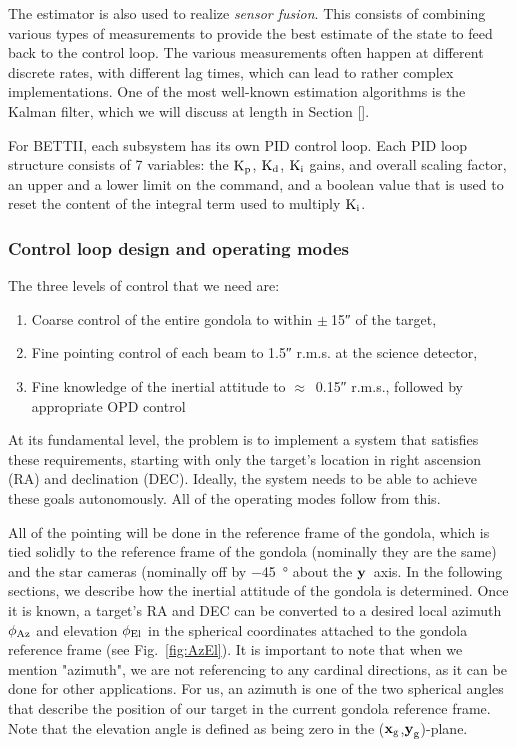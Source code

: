 The estimator is also used to realize \textit{sensor fusion}. This consists of combining various types of measurements to provide the best estimate of the state to feed back to the control loop. The various measurements often happen at different discrete rates, with different lag times, which can lead to rather complex implementations. One of the most well-known estimation algorithms is the Kalman filter, which we will discuss at length in Section []. 

For BETTII, each subsystem has its own PID control loop. Each PID loop structure consists of 7 variables: the $\textrm{K}_\textrm{p}$, $\textrm{K}_\textrm{d}$, $\textrm{K}_\textrm{i}$ gains, and overall scaling factor, an upper and a lower limit on the command, and a boolean value that is used to reset the content of the integral term used to multiply $\textrm{K}_\textrm{i}$. 

\subsubsection{Control loop design and operating modes}

The three levels of control that we need are:
\begin{enumerate}
\item Coarse control of the entire gondola to within $\pm~$\ang{;;15} of the target,
\item Fine pointing control of each beam to \ang{;;1.5} r.m.s. at the science detector,
\item Fine knowledge of the inertial attitude to $\approx$~\ang{;;0.15} r.m.s., followed by appropriate OPD control
\end{enumerate}

At its fundamental level, the problem is to implement a system that satisfies these requirements, starting with only the target's location in right ascension (RA) and declination (DEC). Ideally, the system needs to be able to achieve these goals autonomously. All of the operating modes follow from this.

All of the pointing will be done in the reference frame of the gondola, which is tied solidly to the reference frame of the gondola (nominally they are the same) and the star cameras (nominally off by \SI{-45}{\degree} about the $\textrm{\textbf{y}}$~axis. In the following sections, we describe how the inertial attitude of the gondola is determined. Once it is known, a target's RA and DEC can be converted to a desired local azimuth $\phi_\textrm{Az}$ and elevation $\phi_\textrm{El}$ in the spherical coordinates attached to the gondola reference frame (see Fig.~\ref{fig:AzEl}). It is important to note that when we mention "azimuth", we are not referencing to any cardinal directions, as it can be done for other applications. For us, an azimuth is one of the two spherical angles that describe the position of our target in the current gondola reference frame. Note that the elevation angle is defined as being zero in the ($\textrm{\textbf{x}}_{\textrm{g}}$,$\textrm{\textbf{y}}_{\textrm{g}}$)-plane.

